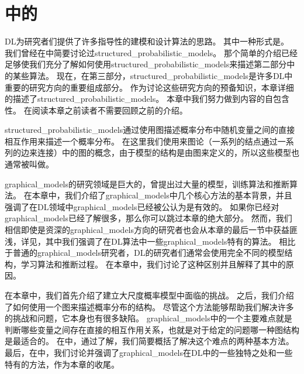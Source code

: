 \chapter{中的}
\label{chap:structured_probabilistic_models_for_deep_learning}


\gls{DL}为研究者们提供了许多指导性的建模和设计算法的思路。
其中一种形式是。
我们曾经在中简要讨论过\gls{structured_probabilistic_models}。
那个简单的介绍已经足够使我们充分了解如何使用\gls{structured_probabilistic_models}来描述第二部分中的某些算法。
现在，在第三部分，\gls{structured_probabilistic_models}是许多\gls{DL}中重要的研究方向的重要组成部分。
作为讨论这些研究方向的预备知识，本章详细的描述了\gls{structured_probabilistic_models}。
本章中我们努力做到内容的自包含性。
在阅读本章之前读者不需要回顾之前的介绍。


\gls{structured_probabilistic_models}通过使用图描述概率分布中随机变量之间的直接相互作用来描述一个概率分布。
在这里我们使用来图论（一系列的结点通过一系列的边来连接）中的图的概念，由于模型的结构是由图来定义的，所以这些模型也通常被叫做。


\gls{graphical_models}的研究领域是巨大的，曾提出过大量的模型，训练算法和推断算法。
在本章中，我们介绍了\gls{graphical_models}中几个核心方法的基本背景，并且强调了在\gls{DL}领域中\gls{graphical_models}已经被公认为是有效的。
如果你已经对\gls{graphical_models}已经了解很多，那么你可以跳过本章的绝大部分。
然而，我们相信即使是资深的\gls{graphical_models}方向的研究者也会从本章的最后一节中获益匪浅，详见，其中我们强调了在\gls{DL}算法中一些\gls{graphical_models}特有的算法。
相比于普通的\gls{graphical_models}研究者，\gls{DL}的研究者们通常会使用完全不同的模型结构，学习算法和推断过程。
在本章中，我们讨论了这种区别并且解释了其中的原因。


在本章中，我们首先介绍了建立大尺度概率模型中面临的挑战。
之后，我们介绍了如何使用一个图来描述概率分布的结构。
尽管这个方法能够帮助我们解决许多的挑战和问题，它本身也有很多缺陷。
\gls{graphical_models}中的一个主要难点就是判断哪些变量之间存在直接的相互作用关系，也就是对于给定的问题哪一种图结构是最适合的。
在中，通过了解，我们简要概括了解决这个难点的两种基本方法。
最后，在中，我们讨论并强调了\gls{graphical_models}在\gls{DL}中的一些独特之处和一些特有的方法，作为本章的收尾。



